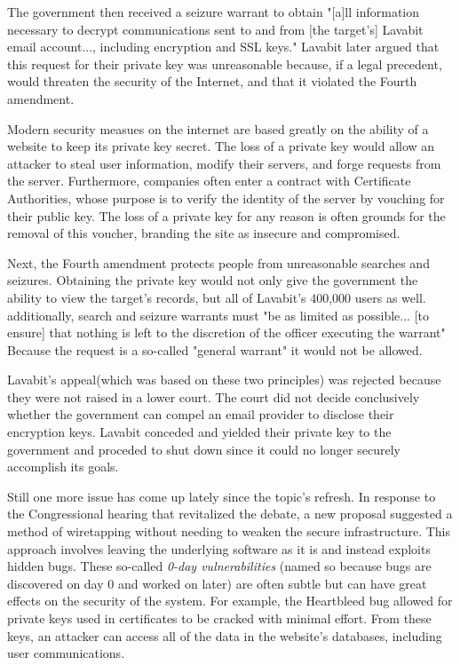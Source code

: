 \documentclass[12pt]{turabian-researchpaper}
\begin{document}
The government then received a seizure warrant to obtain "[a]ll information necessary to decrypt communications sent to and from [the target's] Lavabit email account..., including encryption and SSL keys."
Lavabit later argued that this request for their private key was unreasonable because, if a legal precedent, would threaten the security of the Internet, and that it violated the Fourth amendment.

Modern security measues on the internet are based greatly on the ability of a website to keep its private key secret.
The loss of a private key would allow an attacker to steal user information, modify their servers, and forge requests from the server.
Furthermore, companies often enter a contract with Certificate Authorities, whose purpose is to verify the identity of the server by vouching for their public key.
The loss of a private key for any reason is often grounds for the removal of this voucher, branding the site as insecure and compromised.

Next, the Fourth amendment protects people from unreasonable searches and seizures.
Obtaining the private key would not only give the government the ability to view the target's records, but all of Lavabit's 400,000 users as well.
additionally, search and seizure warrants must "be as limited as possible... [to ensure] that nothing is left to the discretion of the officer executing the warrant"
Because the request is a so-called "general warrant" it would not be allowed.

Lavabit's appeal(which was based on these two principles) was rejected because they were not raised in a lower court.
The court did not decide conclusively whether the government can compel an email provider to disclose their encryption keys.
Lavabit conceded and yielded their private key to the government and proceded to shut down since it could no longer securely accomplish its goals.

Still one more issue has come up lately since the topic's refresh. 
In response to the Congressional hearing that revitalized the debate, a new proposal suggested a method of wiretapping without needing to weaken the secure infrastructure.
This approach involves leaving the underlying software as it is and instead exploits hidden bugs.
These so-called \textit{0-day vulnerabilities} (named so because bugs are discovered on day 0 and worked on later) are often subtle but can have great effects on the security of the system.
For example, the Heartbleed bug allowed for private keys used in certificates to be cracked with minimal effort.
From these keys, an attacker can access all of the data in the website's databases, including user communications.
\end{document}
